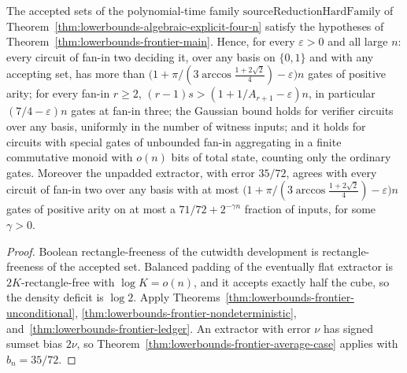 \begin{theorem}
  \label{thm:lowerbounds-frontier-explicit}
  \leanok
  The accepted sets of the polynomial-time family
  $\mathrm{sourceReductionHardFamily}$ of
  Theorem~\ref{thm:lowerbounds-algebraic-explicit-four-n} satisfy the hypotheses
  of Theorem~\ref{thm:lowerbounds-frontier-main}. Hence, for every
  $\varepsilon>0$ and all large $n$: every circuit of fan-in two deciding it,
  over any basis on $\{0,1\}$ and with any accepting set, has more than
  $\bigl(1+\pi/(3\arccos\tfrac{1+2\sqrt2}{4})-\varepsilon\bigr)n$ gates of
  positive arity; for every fan-in $r\ge2$, $(r-1)s>(1+1/A_{r+1}-\varepsilon)n$,
  in particular $(7/4-\varepsilon)n$ gates at fan-in three; the
  Gaussian bound holds for verifier circuits over any basis, uniformly in the
  number of witness inputs; and it holds for circuits with special gates of
  unbounded fan-in aggregating in a finite commutative monoid with $o(n)$ bits
  of total state, counting only the ordinary gates. Moreover the unpadded
  extractor, with error $35/72$, agrees with every circuit of fan-in two over any
  basis with at most $\bigl(1+\pi/(3\arccos\tfrac{1+2\sqrt2}{4})-\varepsilon\bigr)n$
  gates of positive arity on at most a $71/72+2^{-\gamma n}$ fraction of inputs,
  for some $\gamma>0$.
\end{theorem}
\begin{proof}
  \leanok
  Boolean rectangle-freeness of the cutwidth development is rectangle-freeness
  of the accepted set. Balanced padding of the eventually flat extractor is
  $2K$-rectangle-free with $\log K=o(n)$, and it accepts exactly half the cube,
  so the density deficit is $\log2$. Apply
  Theorems~\ref{thm:lowerbounds-frontier-unconditional},
  \ref{thm:lowerbounds-frontier-nondeterministic},
  and~\ref{thm:lowerbounds-frontier-ledger}. An extractor with error $\nu$ has
  signed sumset bias $2\nu$, so
  Theorem~\ref{thm:lowerbounds-frontier-average-case} applies with
  $b_n=35/72$.
\end{proof}

